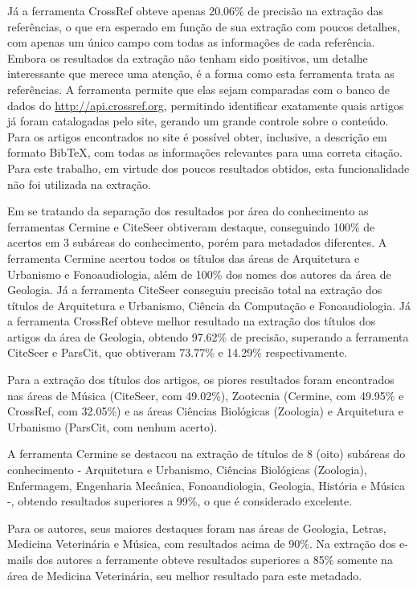 Já a ferramenta CrossRef obteve apenas 20.06\% de precisão na extração das referências, o que era esperado em função de sua extração com poucos detalhes, com apenas um único campo com todas as informações de cada referência. Embora os resultados da extração não tenham sido positivos, um detalhe interessante que merece uma atenção, é a forma como esta ferramenta trata as referências. A ferramenta permite que elas sejam comparadas com o banco de dados do \url{http://api.crossref.org}, permitindo identificar exatamente quais artigos já foram catalogadas pelo site, gerando um grande controle sobre o conteúdo. Para os artigos encontrados no site é possível obter, inclusive, a descrição em formato BibTeX, com todas as informações relevantes para uma correta citação. Para este trabalho, em virtude dos poucos resultados obtidos, esta funcionalidade não foi utilizada na extração.


Em se tratando da separação dos resultados por área do conhecimento as ferramentas Cermine e CiteSeer obtiveram destaque, conseguindo 100\% de acertos em 3 subáreas do conhecimento, porém para metadados diferentes. A ferramenta Cermine acertou todos os títulos das áreas de Arquitetura e Urbanismo e Fonoaudiologia, além de 100\% dos nomes dos autores da área de Geologia. Já a ferramenta CiteSeer conseguiu precisão total na extração dos títulos de Arquitetura e Urbanismo, Ciência da Computação e Fonoaudiologia. Já a ferramenta CrossRef obteve melhor resultado na extração dos títulos dos artigos da área de Geologia, obtendo 97.62\% de precisão, superando a ferramenta CiteSeer e ParsCit, que obtiveram 73.77\% e 14.29\% respectivamente.

Para a extração dos títulos dos artigos, os piores resultados foram encontrados nas áreas de Música (CiteSeer, com 49.02\%), Zootecnia (Cermine, com 49.95\% e CrossRef, com 32.05\%) e as áreas Ciências Biológicas (Zoologia) e Arquitetura e Urbanismo (ParsCit, com nenhum acerto).

A ferramenta Cermine se destacou na extração de títulos de 8 (oito) subáreas do conhecimento - Arquitetura e Urbanismo, Ciências Biológicas (Zoologia), Enfermagem, Engenharia Mecânica, Fonoaudiologia, Geologia, História e Música -, obtendo resultados superiores a 99\%, o que é considerado excelente. 

Para os autores, seus maiores destaques foram nas áreas de Geologia, Letras, Medicina Veterinária e Música, com resultados acima de 90\%. Na extração dos e-mails dos autores a ferramente obteve resultados superiores a 85\% somente na área de Medicina Veterinária, seu melhor resultado para este metadado.

